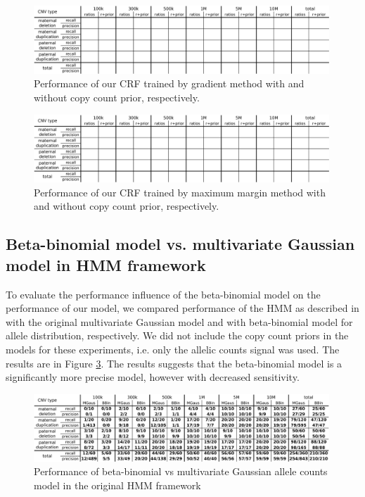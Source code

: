 \begin{figure}
\caption{Performance of our CRF trained by gradient method with and without copy count prior, respectively.}
\label{fig:CRFbyGM}
\centering
\includegraphics[width=0.99\textwidth]{figures/crf_gradient}
\end{figure}

\begin{figure}
\caption{Performance of our CRF trained by maximum margin method with and without copy count prior, respectively.}
\label{fig:CRFbyMM}
\centering
\includegraphics[width=0.99\textwidth]{figures/crf_margin}
\end{figure}

\subsection{Beta-binomial model vs. multivariate Gaussian model in HMM framework}
To evaluate the performance influence of the beta-binomial model on the performance of our model, we compared performance of the HMM as described in \cite{rampasek2014fcnv} with the original multivariate Gaussian model and with beta-binomial model for allele distribution, respectively. We did not include the copy count priors in the models for these experiments, i.e. only the allelic counts signal was used. The results are in Figure \ref{fig:BBvsMG}. The results suggests that the beta-binomial model is a significantly more precise model, however with decreased sensitivity.

\begin{figure}
\caption{Performance of beta-binomial vs multivariate Gaussian allele counts model in the original HMM framework}
\label{fig:BBvsMG}
\centering
\includegraphics[width=0.99\textwidth]{figures/hmm_bb_mg}
\end{figure}


